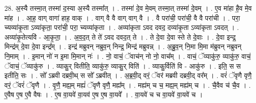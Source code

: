 \documentclass[17pt]{extarticle}
\begin{document}
28. अ॒स्यै तस्मा॒त् तस्मा॑ द॒स्या अ॒स्यै तस्मा᳚त् । . तस्मा॑ दे॒व मे॒वम् तस्मा॒त् तस्मा॑ दे॒वम् । . ए॒व मा॑हा है॒व मे॒व मा॑ह । . आ॒ह॒ वाग् वागा॑ हाह॒ वाक् । . वाग् वै वै वाग् वाग् वै । . वै परा॑ची॒ परा॑ची॒ वै वै परा॑ची । . परा॒ च्यव्या॑कृ॒ता ऽव्या॑कृता॒ परा॑ची॒ परा॒ च्यव्या॑कृता । . अव्या॑कृता ऽवद दवद॒ दव्या॑कृ॒ता ऽव्या॑कृता ऽवदत् । . अव्या॑कृ॒तेत्यवि॑ - आ॒कृ॒ता॒ । . अ॒व॒द॒त् ते ते॑ ऽवद दवद॒त् ते । . ते दे॒वा दे॒वा स्ते ते दे॒वाः । . दे॒वा इन्द्र॒ मिन्द्र॑म् दे॒वा दे॒वा इन्द्र᳚म् । . इन्द्र॑ मब्रुवन् नब्रुव॒न् निन्द्र॒ मिन्द्र॑ मब्रुवन्न् । . अ॒ब्रु॒व॒न् नि॒मा मि॒मा म॑ब्रुवन् नब्रुवन् नि॒माम् । . इ॒मान् नो॑ न इ॒मा मि॒मान् नः॑ । . नो॒ वाचं॒ ॅवाच॑न् नो नो॒ वाच᳚म् । . वाचं॒ ॅव्याकु॑रु॒ व्याकु॑रु॒ वाचं॒ ॅवाचं॒ ॅव्याकु॑रु । . व्याकु॒र् वितीति॒ व्याकु॑रु॒ व्याकु॒र् विति॑ । . व्याकु॒र्विति॑ वि - आकु॑रु । . इति॒ स स इतीति॒ सः । . सो᳚ ऽब्रवी दब्रवी॒थ् स सो᳚ ऽब्रवीत् । . अ॒ब्र॒वी॒द् वरं॒ ॅवर॑ मब्रवी दब्रवी॒द् वर᳚म् । . वरं॑ ॅवृणै वृणै॒ वरं॒ ॅवरं॑ ॅवृणै । . वृ॒णै॒ मह्य॒म् मह्यं॑ ॅवृणै वृणै॒ मह्य᳚म् । . मह्य॑म् च च॒ मह्य॒म् मह्य॑म् च । . चै॒वैव च॑ चै॒व । . ए॒वैष ए॒ष ए॒वै वैषः । . ए॒ष वा॒यवे॑ वा॒यव॑ ए॒ष ए॒ष वा॒यवे᳚ । . वा॒यवे॑ च च वा॒यवे॑ वा॒यवे॑ च । \newline
\end{document}
